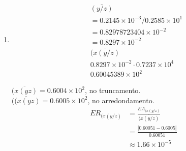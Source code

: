\documentclass{article}
\begin{document}
\begin{enumerate}
\begin{enumerate}
    $\overline{(xy)/z} = 0.6003\times 10^{0}$, no truncamento. \\
    $\overline{(xy)/z} = 0.6004\times 10^{0}$, no arredondamento. \\

    O valor real seria $\approx 0.60051$.\\

    \begin{align*}
        ER_{(xy)/z} &= \frac{EA_{(xy)/z}}{\overline{(xy)/z}}\\
        &=\frac{0.60051 - 0.6004}{0.60051}\\
        &\approx 1.83\times 10^{-4}
    \end{align*}    
    \item 
        \begin{align*}
        &\overline{(y/z)}\\
        &=0.2145 \times 10^{-3}/0.2585 \times 10^{1}\\
        &= 0.82978723404 \times 10^{-2}\\
        &=0.8297 \times 10^{-2} \\
        &\overline{(x(y/z)}\\
        & 0.8297 \times 10^{-2} \cdot 0.7237 \times 10^{4}\\
        & 0.60045389 \times 10^{2}
    \end{align*}
    
    $\overline{(x(yz)} = 0.6004\times 10^{2}$, no truncamento. \\
    $\overline{((x(yz)} = 0.6005\times 10^{2}$, no arredondamento. \\

    \begin{align*}
        ER_{(x(y/z)} &= \frac{EA_{(x(y/z)}}{\overline{(x(y/z)}}\\
        &=\frac{|0.60051 - 0.6005|}{0.60051}\\
        &\approx 1.66 \times 10^{-5}
    \end{align*}    
\end{enumerate}
\end{enumerate}
\end{document}
